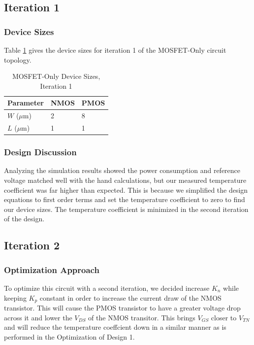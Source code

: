 \documentclass[conference]{IEEEtran}
\begin{document}
\subsection{Iteration 1}
\subsubsection{Device Sizes}
Table \ref{tab:mo-ds-1} gives the device sizes for iteration 1 of the MOSFET-Only circuit topology.
\begin{table}[!htbp]
  \caption[]{MOSFET-Only Device Sizes, Iteration 1}
  \label{tab:mo-ds-1}
  \centering
  \begin{tabular}{|l|l|l|}
    \hline
    Parameter			& NMOS	&PMOS \\ \hline
    $W$ ($\mu$m)		&2		&8\\ 
    $L$ ($\mu$m)		& 1		&1\\
    \hline
  \end{tabular}
\end{table}
\subsubsection{Design Discussion}
Analyzing the simulation results showed the power consumption and reference voltage matched well with the hand calculations, but our measured temperature coefficient was far higher than expected.  This is because we simplified the design equations to first order terms and set the temperature coefficient to zero to find our device sizes.  The temperature coefficient is minimized in the second iteration of the design.

\subsection{Iteration 2}
\subsubsection{Optimization Approach}
To optimize this circuit with a second iteration, we decided increase $K_n$ while keeping $K_p$ constant in order to increase the current draw of the NMOS transistor.  This will cause the PMOS transistor to have a greater voltage drop across it and lower the $V_{DS}$ of the NMOS transitor.  This brings $V_{GS}$ closer to $V_{TN}$ and will reduce the temperature coeffcient down in a similar manner as is performed in the Optimization of Design 1.
\end{document}
